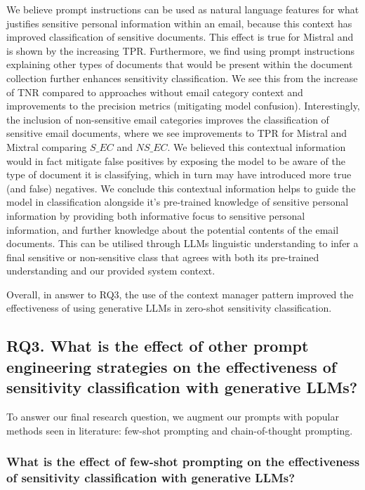 We believe prompt instructions can be used as natural language features for what justifies sensitive personal information within an email, because this context has improved classification of sensitive documents. This effect is true for Mistral and is shown by the increasing TPR. Furthermore, we find using prompt instructions explaining other types of documents that would be present within the document collection further enhances sensitivity classification. We see this from the increase of TNR compared to approaches without email category context and improvements to the precision metrics (mitigating model confusion). Interestingly, the inclusion of non-sensitive email categories improves the classification of sensitive email documents, where we see improvements to TPR for Mistral and Mixtral comparing $S\_EC$ and $NS\_EC$. We believed this contextual information would in fact mitigate false positives by exposing the model to be aware of the type of document it is classifying, which in turn may have introduced more true (and false) negatives. We conclude this contextual information helps to guide the model in classification alongside it’s pre-trained knowledge of sensitive personal information by providing both informative focus to sensitive personal information, and further knowledge about the potential contents of the email documents. This can be utilised through LLMs linguistic understanding to infer a final sensitive or non-sensitive class that agrees with both its pre-trained understanding and our provided system context.

Overall, in answer to RQ3, the use of the context manager pattern improved the effectiveness of using generative LLMs in zero-shot sensitivity classification.

\subsection{RQ3. What is the effect of other prompt engineering strategies on the effectiveness of sensitivity classification with generative LLMs?}

To answer our final research question, we augment our prompts with popular methods seen in literature: few-shot prompting and chain-of-thought prompting.

\subsubsection{What is the effect of few-shot prompting on the effectiveness of sensitivity classification with generative LLMs?}

